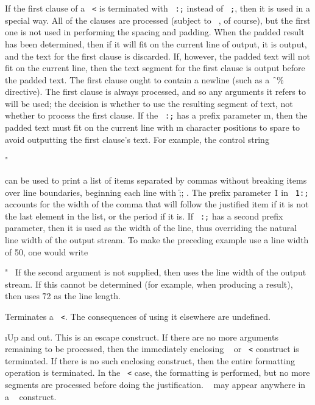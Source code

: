 If the first clause of a {\tt ~<} 
is terminated with {\tt ~:;} instead of
{\tt ~;}, then it is used in a special way.  All of the clauses are
processed (subject to {\tt ~\hat }, of course), but the 
first one is not used
in performing the spacing and padding.  When the padded result has been
determined, then if it will fit on the current line of output, it is
output, and the text for the first clause is discarded.  If, however, the
padded text will not fit on the current line, then the text segment for
the first clause is output before the padded text.  The first clause
ought to contain a newline (such as a \f{~\%} directive).  The first
clause is always processed, and so any arguments it refers to will be
used; the decision is whether to use the resulting segment of text, not
whether to process the first clause.  If the {\tt ~:;} has a prefix
parameter \i{n}, then the padded text must fit on the current line with
\i{n} character positions to spare to avoid outputting the first clause's
text.  For example, the control string

\code
 "~%
\endcode

can be used to print a list of items separated by commas without
breaking items over line boundaries, beginning each line with
\f{;; }.  The prefix parameter 
\f{1} in {\tt ~1:;} accounts for the width of the
comma that will follow the justified item if it is not the last
element in the list, or the period 
if it is.  If {\tt ~:;} has a second
prefix parameter, then it is used as the width of the line,
thus overriding the natural line width of the output stream.  To make
the preceding example use a line width of 50, one would write
     
\code
 "~%
\endcode
If the second argument is not supplied, then  uses the
line width of the  output stream.
If this cannot be determined (for example, when producing a 
 result), then  uses \f{72} as the line length.

\itemitem{\f{~>}}

Terminates a {\tt ~<}.
The consequences of using it elsewhere are undefined.

\itemitem{\f{~\hat }}

\i{Up and out}. This is an escape construct.  If there are no more arguments remaining to
be processed, then the immediately           
enclosing {\tt ~\lbr  } or {\tt ~<} construct
is terminated.  If there is no such enclosing construct, then the entire
formatting operation is terminated.  
In the {\tt ~<} case, the formatting
is performed, but no more segments are processed before doing the
justification.     
{\tt ~\hat } may appear anywhere in a {\tt ~\lbr  }
construct.

